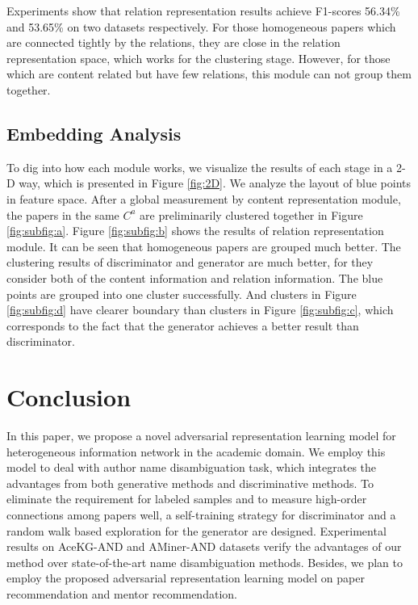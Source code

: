 \documentclass[letterpaper]{article} %
\begin{document}
Experiments show that relation representation results achieve F1-scores 56.34\% and 53.65\% on two datasets respectively. 
For those homogeneous papers which are connected tightly by the relations, they are close in the relation representation space, which works for the clustering stage. However, for those which are content related but have few relations, this module can not group them together. 

\subsection{Embedding Analysis}
To dig into how each module works, we visualize the results of each stage in a 2-D way, which is presented in Figure \ref{fig:2D}. 
We analyze the layout of blue points in feature space. 
After a global measurement by content representation module, the papers in the same $C^a$ are preliminarily clustered together in Figure \ref{fig:subfig:a}. 
Figure \ref{fig:subfig:b} shows the results of relation representation module. It can be seen that homogeneous papers are grouped much better. 
The clustering results of discriminator and generator are much better, for they consider both of the content information and relation information. 
The blue points are grouped into one cluster successfully. 
And clusters in Figure \ref{fig:subfig:d} have clearer boundary than clusters in Figure \ref{fig:subfig:c}, which corresponds to the fact that the generator achieves a better result than discriminator.

\section{Conclusion}
In this paper, we propose a novel adversarial representation learning model for heterogeneous information network in the academic domain. 
We employ this model to deal with author name disambiguation task, which integrates the advantages from both generative methods and discriminative methods. 
To eliminate the requirement for labeled samples and to measure high-order connections among papers well, a self-training strategy for discriminator and a random walk based exploration for the generator are designed. 
Experimental results on AceKG-AND and AMiner-AND datasets verify the advantages of our method over state-of-the-art name disambiguation methods.
Besides, we plan to employ the proposed adversarial representation learning model on paper recommendation and mentor recommendation.
\end{document}
